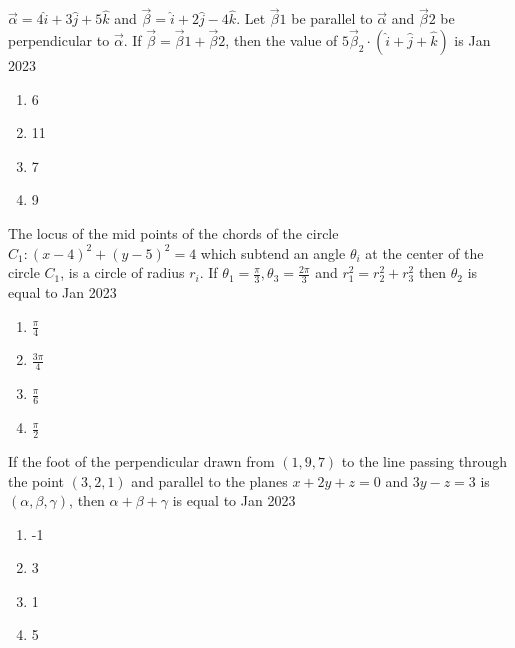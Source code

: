 \item $\overrightarrow{\alpha}=4\hat{i}+3\hat{j}+5\hat{k}$ and $ \overrightarrow{\beta}=\hat{i}+2\hat{j}-4\hat{k}$. Let  $\overrightarrow{\beta}{1}$ be parallel to $\overrightarrow{\alpha}$ and $\overrightarrow{\beta}{2}$ be perpendicular to $\overrightarrow{\alpha}$. If $\overrightarrow{\beta}=\overrightarrow{\beta}{1}+\overrightarrow{\beta}{2}$, then the value of $5\overrightarrow{\beta}_{2}\cdot(\hat{i}+\hat{j}+\hat{k})$ is
\hfill{Jan 2023}\begin{enumerate}
    \item 6
    \item 11
    \item 7
    \item 9
\end{enumerate}
\item The locus of the mid points of the chords of the
circle $C_{1}:(x-4)^{2}+(y-5)^{2}=4$ which subtend an angle $\theta_{i}$ at the center of the circle $C_{1}$, is a circle of radius $ r_{i}$. If $ \theta_{1}=\frac{\pi}{3},\theta_{3}=\frac{2\pi}{3} $ and $ r_{1}^{2}=r_{2}^{2}+r_{3}^{2}$ then $\theta_{2}$ is equal to  
\hfill{Jan 2023}\begin{enumerate}
    \item $\frac{\pi}{4}$
    \item $\frac{3\pi}{4}$
    \item $\frac{\pi}{6}$
    \item $\frac{\pi}{2}$

\end{enumerate}
\item If the foot of the perpendicular drawn from $(1, 9,
7)$ to the line passing through the point $(3, 2, 1)$ and
parallel to the planes $x + 2y + z = 0$ and $3y-z = 3$
is $(\alpha, \beta, \gamma)$, then $\alpha + \beta + \gamma$ is equal to
\hfill{Jan 2023}\begin{enumerate}
    \item -1
    \item 3
    \item 1
    \item 5
\end{enumerate}
